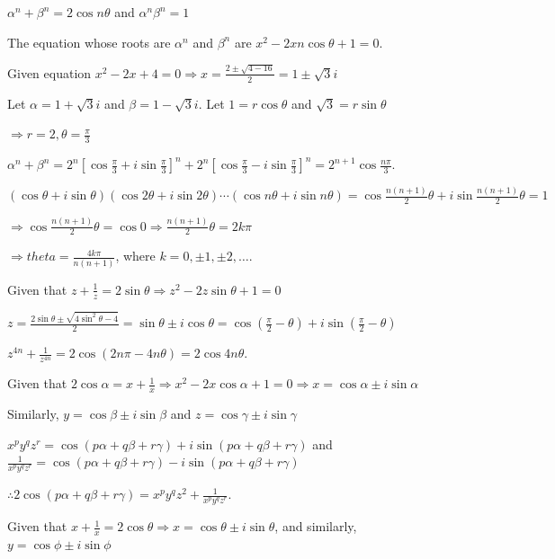   $\alpha^n + \beta^n = 2\cos n\theta$ and $\alpha^n\beta^n = 1$

  The equation whose roots are $\alpha^n$ and $\beta^n$ are $x^2 - 2xn\cos\theta + 1 = 0$.
\item Given equation $x^2 - 2x + 4 = 0\Rightarrow x = \frac{2\pm\sqrt{4 - 16}}{2} = 1\pm\sqrt{3}i$

  Let $\alpha = 1 + \sqrt{3}i$ and $\beta = 1 - \sqrt{3}i$. Let $1 = r\cos\theta$ and $\sqrt{3} =
  r\sin\theta$

  $\Rightarrow r = 2, \theta = \frac{\pi}{3}$

  $\alpha^n + \beta^n = 2^{n}\left[\cos\frac{\pi}{3} + i\sin\frac{\pi}{3}\right]^n +
  2^{n}\left[\cos\frac{\pi}{3} - i\sin\frac{\pi}{3}\right]^n = 2^{n + 1}\cos\frac{n\pi}{3}$.
\item $(\cos\theta + i\sin\theta)(\cos2\theta + i\sin2\theta)\cdots(\cos n\theta + i\sin n\theta)
  = \cos\frac{n(n + 1)}{2}\theta + i\sin\frac{n(n + 1)}{2}\theta = 1$

  $\Rightarrow \cos\frac{n(n + 1)}{2}\theta = \cos 0 \Rightarrow \frac{n(n + 1)}{2}\theta = 2k\pi$

  $\Rightarrow theta = \frac{4k\pi}{n(n + 1)}$, where $k = 0, \pm1, \pm2, \ldots$.
\item Given that $z + \frac{1}{z} = 2\sin\theta \Rightarrow z^2 - 2z\sin\theta + 1 = 0$

  $z = \frac{2\sin\theta\pm\sqrt{4\sin^2\theta - 4}}{2} = \sin\theta\pm i\cos\theta
  = \cos\left(\frac{\pi}{2} - \theta\right) + i\sin\left(\frac{\pi}{2} - \theta\right)$

  $z^{4n} + \frac{1}{z^{4n}} = 2\cos(2n\pi - 4n\theta) = 2\cos4n\theta$.
\item Given that $2\cos\alpha = x + \frac{1}{x} \Rightarrow x^2 - 2x\cos\alpha + 1 = 0 \Rightarrow x
  = \cos\alpha\pm i\sin\alpha$

  Similarly, $y = \cos\beta\pm i\sin\beta$ and $z = \cos\gamma\pm i\sin\gamma$

  $x^py^qz^r = \cos (p\alpha + q\beta + r\gamma) + i\sin(p\alpha + q\beta + r\gamma)$ and
  $\frac{1}{x^py^qz^r} = \cos(p\alpha + q\beta + r\gamma) - i\sin(p\alpha + q\beta + r\gamma)$

  $\therefore 2\cos(p\alpha + q\beta + r\gamma) = x^py^qz^2 + \frac{1}{x^py^qz^r}$.
\item Given that $x + \frac{1}{x} = 2\cos\theta \Rightarrow x = \cos\theta\pm i\sin\theta$, and similarly,
  $y = \cos\phi\pm i\sin\phi$

